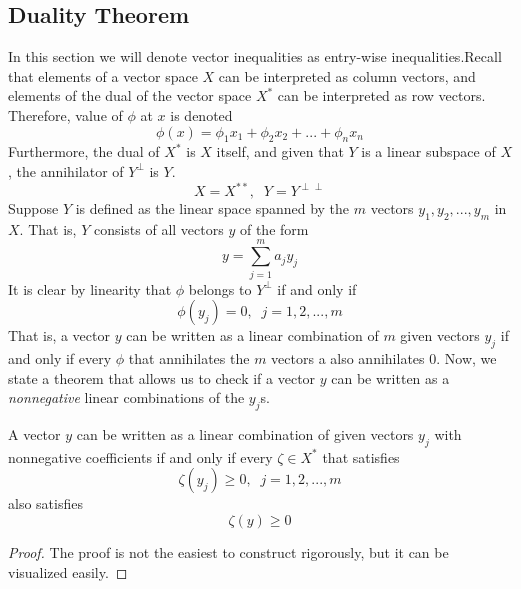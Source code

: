 \subsection{Duality Theorem}

  In this section we will denote vector inequalities as entry-wise inequalities.Recall that elements of a vector space $X$ can be interpreted as column vectors, and elements of the dual of the vector space $X^\ast$ can be interpreted as row vectors. Therefore, value of $\phi$ at $x$ is denoted
  \begin{equation}
    \phi (x) = \phi_1 x_1 + \phi_2 x_2 + ... + \phi_n x_n
  \end{equation}
  Furthermore, the dual of $X^\ast$ is $X$ itself, and given that $Y$ is a linear subspace of $X$, the annihilator of $Y^\perp$ is $Y$. 
  \begin{equation}
    X = X^{**}, \;\; Y = Y^{\perp\perp}
  \end{equation}
  Suppose $Y$ is defined as the linear space spanned by the $m$ vectors $y_1, y_2, ..., y_m$ in $X$. That is, $Y$ consists of all vectors $y$ of the form
  \begin{equation}
    y = \sum_{j=1}^m a_j y_j
  \end{equation}
  It is clear by linearity that $\phi$ belongs to $Y^\perp$ if and only if
  \begin{equation}
    \phi (y_j) = 0, \;\; j = 1, 2, ..., m
  \end{equation}
  That is, a vector $y$ can be written as a linear combination of $m$ given vectors $y_j$ if and only if every $\phi$ that annihilates the $m$ vectors a also annihilates $0$. Now, we state a theorem that allows us to check if a vector $y$ can be written as a \textit{nonnegative} linear combinations of the $y_j$s. 

  \begin{theorem}
  A vector $y$ can be written as a linear combination of given vectors $y_j$ with nonnegative coefficients if and only if every $\zeta \in X^\ast$ that satisfies 
  \begin{equation}
     \zeta (y_j) \geq 0, \;\; j = 1, 2, ..., m
  \end{equation}
  also satisfies 
  \begin{equation}
    \zeta (y) \geq 0
  \end{equation}
  \end{theorem}
  \begin{proof}
  The proof is not the easiest to construct rigorously, but it can be visualized easily. 
  \end{proof}

